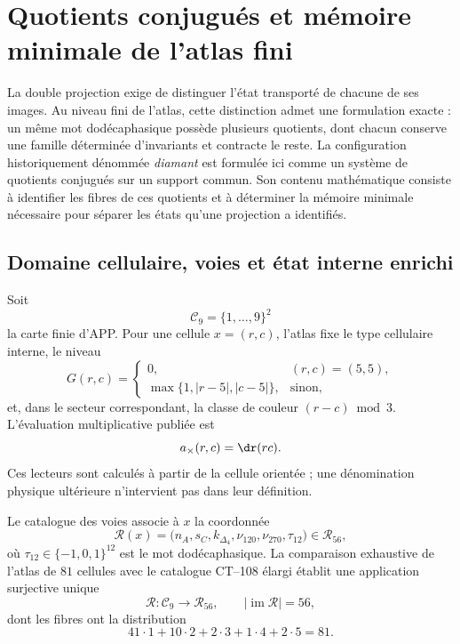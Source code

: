 \section[Quotients conjugués et mémoire minimale]{Quotients conjugués et
mémoire minimale de l'atlas fini}
\label{sec:cocientes-conjugados-rev11}

La double projection exige de distinguer l'état transporté de chacune de
ses images. Au niveau fini de l'atlas, cette distinction admet une
formulation exacte : un même mot dodécaphasique possède plusieurs quotients,
dont chacun conserve une famille déterminée d'invariants et
contracte le reste. La configuration historiquement dénommée
\emph{diamant} est formulée ici comme un système de quotients conjugués sur
un support commun. Son contenu mathématique consiste à identifier les fibres
de ces quotients et à déterminer la mémoire minimale nécessaire pour séparer
les états qu'une projection a identifiés.

\subsection{Domaine cellulaire, voies et état interne enrichi}

Soit
\[
 \mathcal C_9=\{1,\ldots,9\}^2
\]
la carte finie d'APP. Pour une cellule \(x=(r,c)\), l'atlas fixe le type
cellulaire interne, le niveau
\[
 G(r,c)=
 \begin{cases}
 0,&(r,c)=(5,5),\\
 \max\{1,|r-5|,|c-5|\},&\text{sinon},
 \end{cases}
\]
et, dans le secteur correspondant, la classe de couleur \((r-c)\bmod 3\).
L'évaluation multiplicative publiée est
\[
 a_{\times}(r,c)=\dr(rc).
\]
Ces lecteurs sont calculés à partir de la cellule orientée ; une dénomination physique
ultérieure n'intervient pas dans leur définition.

Le catalogue des voies associe à \(x\) la coordonnée
\[
 \mathcal R(x)=
 \bigl(n_A,s_C,k_{\Delta_4},\nu_{120},\nu_{270},\tau_{12}\bigr)
 \in\mathscr R_{56},
\]
où \(\tau_{12}\in\{-1,0,1\}^{12}\) est le mot dodécaphasique. La
comparaison exhaustive de l'atlas de \(81\) cellules avec le catalogue CT--108
élargi établit une application surjective unique
\[
 \mathcal R:\mathcal C_9\longrightarrow\mathscr R_{56},
 \qquad |\operatorname{im}\mathcal R|=56,
\]
dont les fibres ont la distribution
\begin{equation}
 41\cdot1+10\cdot2+2\cdot3+1\cdot4+2\cdot5=81.
 \label{eq:fibras-r56-rev11}
\end{equation}

